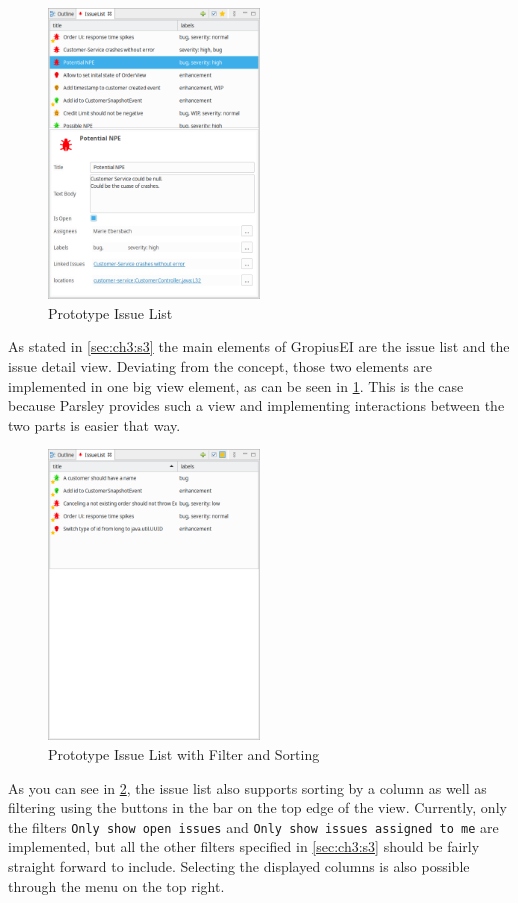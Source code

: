 \begin{figure}[!h]
	\centering
	\includegraphics[width=0.5\textwidth]{graphics/screenshot_gropius_ei_issue_list.png}
	\caption{Prototype Issue List}
	\label{fig:c4:screenshot_issue_list}
\end{figure}
As stated in \cref{sec:ch3:s3} the main elements of \gls{GropiusEI} are the issue list and the issue detail view.
Deviating from the concept, those two elements are implemented in one big view element, as can be seen in \cref{fig:c4:screenshot_issue_list}.
This is the case because \gls{Parsley} provides such a view and implementing interactions between the two parts is easier that way.

\begin{figure}[!h]
	\centering
	\includegraphics[width=0.5\textwidth]{graphics/screenshot_gropius_ei_issue_list_filtered_sorted.png}
	\caption{Prototype Issue List with Filter and Sorting}
	\label{fig:c4:screenshot_issue_list_filtered_sorted}
\end{figure}
As you can see in \cref{fig:c4:screenshot_issue_list_filtered_sorted}, the issue list also supports sorting by a column as well as filtering using the buttons in the bar on the top edge of the view.
Currently, only the filters \lstinline|Only show open issues| and \lstinline|Only show issues assigned to me| are implemented, 
but all the other filters specified in \cref{sec:ch3:s3} should be fairly straight forward to include.
Selecting the displayed columns is also possible through the menu on the top right.

